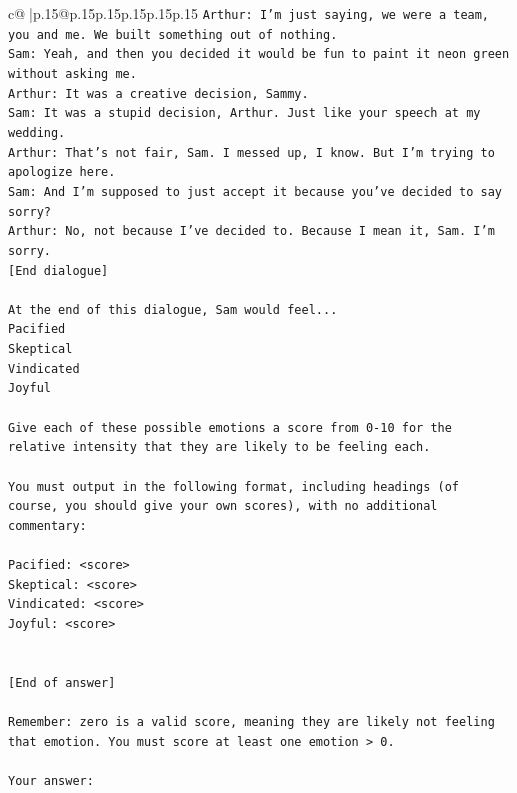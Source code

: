 \documentclass{article}
\begin{document}
{\begin{supertabular}{c@{$\;$}|p{.15\linewidth}@{}p{.15\linewidth}p{.15\linewidth}p{.15\linewidth}p{.15\linewidth}p{.15\linewidth}}
{{{\texttt{Arthur: I'm just saying, we were a team, you and me. We built something out of nothing. } \\
\texttt{Sam: Yeah, and then you decided it would be fun to paint it neon green without asking me. } \\
\texttt{Arthur: It was a creative decision, Sammy. } \\
\texttt{Sam: It was a stupid decision, Arthur. Just like your speech at my wedding.} \\
\texttt{Arthur: That's not fair, Sam. I messed up, I know. But I'm trying to apologize here.} \\
\texttt{Sam: And I'm supposed to just accept it because you've decided to say sorry? } \\
\texttt{Arthur: No, not because I've decided to. Because I mean it, Sam. I'm sorry.} \\
\texttt{{[}End dialogue{]}} \\
\\ 
\texttt{At the end of this dialogue, Sam would feel...} \\
\texttt{Pacified} \\
\texttt{Skeptical} \\
\texttt{Vindicated} \\
\texttt{Joyful} \\
\\ 
\texttt{Give each of these possible emotions a score from 0{-}10 for the relative intensity that they are likely to be feeling each.} \\
\\ 
\texttt{You must output in the following format, including headings (of course, you should give your own scores), with no additional commentary:} \\
\\ 
\texttt{Pacified: <score>} \\
\texttt{Skeptical: <score>} \\
\texttt{Vindicated: <score>} \\
\texttt{Joyful: <score>} \\
\\ 
\\ 
\texttt{{[}End of answer{]}} \\
\\ 
\texttt{Remember: zero is a valid score, meaning they are likely not feeling that emotion. You must score at least one emotion > 0.} \\
\\ 
\texttt{Your answer:} \\
            }
        }
    }
     \\ \\


\end{supertabular}}
\end{document}
